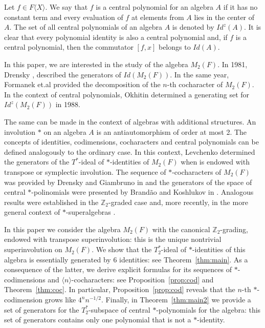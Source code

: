\documentclass[11pt]{amsart}
\theoremstyle{definition}
\theoremstyle{remark}
\begin{document}
Let $f\in F\langle X\rangle$. We say that $f$ is a central polynomial for an algebra $A$ if it has no constant term and every evaluation of $f$ at elements from $A$ lies in the center of $A$. The set of all central polynomials of an algebra $A$ is denoted by $Id^z(A)$. It is clear that every polynomial identity is also a central polynomial and, if $f$ is a central polynomial, then the commutator $[f,x]$ belongs to $Id(A)$.

In this paper, we are interested in the study of the algebra $M_2(F)$. In 1981, Drensky \cite{Drensky1}, described the generators of  $Id(M_2(F))$. In the same year, Formanek et.al \cite{Formanek} provided the decomposition of the $n$-th cocharacter of $M_2(F)$. In the context of central polynomials, Okhitin \cite{Okt} determined a generating set for $Id^z(M_2(F))$ in 1988.

The same can be made in the context of algebras with additional structures. An involution $*$ on an algebra $A$ is an antiautomorphism of order at most 2. The concepts of identities, codimensions, cocharacters and central polynomials can be defined analogously to the ordinary case. In this context, Levchenko \cite{Lev} determined the generators of the $T^*$-ideal of $*$-identities of $M_2(F)$ when is endowed with transpose or symplectic involution. The sequence of $*$-cocharacters of $M_2(F)$ was provided by Drensky and Giambruno in \cite{Giam1} and the generators of the space of central 
$*$-polinomials were presented by Brandão and Koshlukov in \cite{Plamen2}. Analogous results were established in the $\mathbb{Z}_2$-graded case \cite{Plamen3} and, more recently, in the more general context of $*$-superalgebras \cite{Ana}.

In this paper we consider the algebra $M_2(F)$ with the canonical $\mathbb Z_2$-grading, endowed with transpose superinvolution: this is the unique nontrivial superinvolution on $M_2(F)$. We show that the $T_2^*$-ideal of $*$-identities of this algebra is essentially generated by $6$ identities: see Theorem~\ref{thm:main}. As a consequence of the latter, we derive explicit formulas for its sequences of $*$-codimensions and $\langle n\rangle$-cocharacters: see Proposition~\ref{prop:cod} and Theorem~\ref{thm:coc}. In particular, Proposition~\ref{prop:cod} reveals that the $n$-th $*$-codimension grows like $4^nn^{-1/2}$. Finally, in Theorem~\ref{thm:main2} we provide a set of generators for the $T_2^*$-subspace of central $*$-polynomials for the algebra: this set of generators contains only one polynomial that is not a $*$-identity. 
\end{document}
